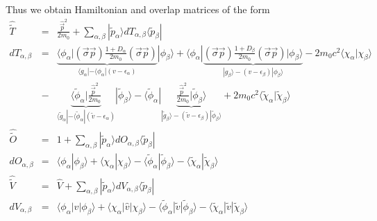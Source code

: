 \documentclass[11pt,a4paper]{report}
\begin{document}
Thus we obtain Hamiltonian and overlap matrices of the form
\begin{eqnarray}
\hat{\tilde{T}}&=&
\frac{\hat{\vec{p}}^2}{2m_0}
+\sum_{\alpha,\beta}|\tilde{p}_\alpha\rangle 
dT_{\alpha,\beta}\langle\tilde{p}_\beta|
\nonumber\\
dT_{\alpha,\beta}&=&
\underbrace{
\langle\phi_\alpha|
(\vec{\sigma}\vec{p})\frac{1+D_\alpha}{2m_0}(\vec{\sigma}\vec{p})
}_{\langle g_\alpha|-\langle\phi_\alpha|(v-\epsilon_\alpha)}
|\phi_\beta\rangle
+\langle\phi_\alpha|
\underbrace{(\vec{\sigma}\vec{p})\frac{1+D_\beta}{2m_0}(\vec{\sigma}\vec{p})
|\phi_\beta\rangle}_{|g_\beta\rangle-(v-\epsilon_\beta)|\phi_\beta\rangle}
-2m_0c^2\langle\chi_\alpha|\chi_\beta\rangle
\nonumber\\
&-&
\underbrace{
\langle\tilde{\phi}_\alpha|\frac{\hat{\vec{p}}^2}{2m_0}
}_{\langle \tilde{g}_\alpha|-\langle\tilde{\phi}_\alpha|(\tilde{v}-\epsilon_\alpha)}
|\tilde{\phi}_\beta\rangle
-\langle\tilde{\phi}_\alpha|
\underbrace{
\frac{\hat{\vec{p}}^2}{2m_0}|\tilde{\phi}_\beta\rangle
}_{|\tilde{g}_\beta\rangle-(\tilde{v}-\epsilon_\beta)|\tilde{\phi}_\beta\rangle}
+2m_0c^2\langle\tilde{\chi}_\alpha|\tilde{\chi}_\beta\rangle
\nonumber\\
\hat{\tilde{O}}&=&1+
\sum_{\alpha,\beta}|\tilde{p}_\alpha\rangle dO_{\alpha,\beta}\langle\tilde{p}_\beta|
\nonumber\\
dO_{\alpha,\beta}&=&
\langle\phi_\alpha|\phi_\beta\rangle+\langle\chi_\alpha|\chi_\beta\rangle
-\langle\tilde{\phi}_\alpha|\tilde{\phi}_\beta\rangle
-\langle\tilde{\chi}_\alpha|\tilde{\chi}_\beta\rangle
\nonumber\\
\hat{\tilde{V}}&=&\hat{V}+
\sum_{\alpha,\beta}|\tilde{p}_\alpha\rangle dV_{\alpha,\beta}\langle\tilde{p}_\beta|
\nonumber\\
dV_{\alpha,\beta}&=&
\langle\phi_\alpha|\hat{v}|\phi_\beta\rangle
+\langle\chi_\alpha|\hat{v}|\chi_\beta\rangle
-\langle\tilde{\phi}_\alpha|\tilde{v}|\tilde{\phi}_\beta\rangle
-\langle\tilde{\chi}_\alpha|\tilde{v}|\tilde{\chi}_\beta\rangle
\end{eqnarray}




\appendix
\end{document}
